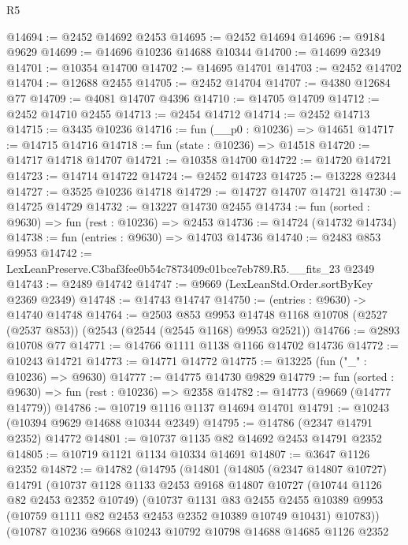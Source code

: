 \begin{lexlean}{R5}
\begin{coremodule}
@14694 := @2452 @14692 @2453
@14695 := @2452 @14694
@14696 := @9184 @9629
@14699 := @14696 @10236 @14688 @10344
@14700 := @14699 @2349
@14701 := @10354 @14700
@14702 := @14695 @14701
@14703 := @2452 @14702
@14704 := @12688 @2455
@14705 := @2452 @14704
@14707 := @4380 @12684 @77
@14709 := @4081 @14707 @4396
@14710 := @14705 @14709
@14712 := @2452 @14710 @2455
@14713 := @2454 @14712
@14714 := @2452 @14713
@14715 := @3435 @10236
@14716 := fun (__p0 : @10236) => @14651
@14717 := @14715 @14716
@14718 := fun (state : @10236) => @14518
@14720 := @14717 @14718 @14707
@14721 := @10358 @14700
@14722 := @14720 @14721
@14723 := @14714 @14722
@14724 := @2452 @14723
@14725 := @13228 @2344
@14727 := @3525 @10236 @14718
@14729 := @14727 @14707 @14721
@14730 := @14725 @14729
@14732 := @13227 @14730 @2455
@14734 := fun (sorted : @9630) => fun (rest : @10236) => @2453
@14736 := @14724 (@14732 @14734)
@14738 := fun (entries : @9630) => @14703 @14736
@14740 := @2483 @853 @9953
@14742 := LexLeanPreserve.C3baf3fee0b54c7873409c01bce7eb789.R5.__fits_23 @2349
@14743 := @2489 @14742
@14747 := @9669 (LexLeanStd.Order.sortByKey @2369 @2349)
@14748 := @14743 @14747
@14750 := (entries : @9630) -> @14740 @14748
@14764 := @2503
    @853
    @9953
    @14748
    @1168
    @10708
    (@2527 (@2537 @853))
    (@2543 (@2544 (@2545 @1168) @9953 @2521))
@14766 := @2893 @10708 @77
@14771 := @14766 @1111 @1138 @1166 @14702 @14736
@14772 := @10243 @14721
@14773 := @14771 @14772
@14775 := @13225 (fun ("_" : @10236) => @9630)
@14777 := @14775 @14730 @9829
@14779 := fun (sorted : @9630) => fun (rest : @10236) => @2358
@14782 := @14773 (@9669 (@14777 @14779))
@14786 := @10719 @1116 @1137 @14694 @14701
@14791 := @10243 (@10394 @9629 @14688 @10344 @2349)
@14795 := @14786 (@2347 @14791 @2352) @14772
@14801 := @10737 @1135 @82 @14692 @2453 @14791 @2352
@14805 := @10719 @1121 @1134 @10334 @14691
@14807 := @3647 @1126 @2352
@14872 := @14782
    (@14795
      (@14801
        (@14805
          (@2347 @14807 @10727)
          @14791
          (@10737
            @1128
            @1133
            @2453
            @9168
            @14807
            @10727
            (@10744 @1126 @82 @2453 @2352 @10749)
            (@10737
              @1131
              @83
              @2455
              @2455
              @10389
              @9953
              (@10759 @1111 @82 @2453 @2453 @2352 @10389 @10749 @10431)
              @10783))
          (@10787
            @10236
            @9668
            @10243
            @10792
            @10798
            @14688
            @14685
            @1126
            @2352

\end{coremodule}
\end{lexlean}
